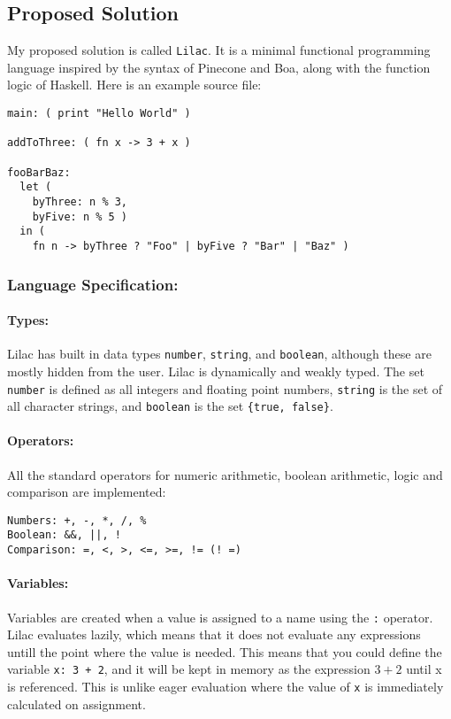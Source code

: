 \documentclass[a4paper, 12pt]{article}
\begin{document}
\subsection{Proposed Solution}\label{sec:proposed-solution}

My proposed solution is called \verb|Lilac|. It is a minimal functional programming language inspired by the syntax of Pinecone and Boa, along with the function logic of Haskell. Here is an example source file:\\
\begin{verbatim}
main: ( print "Hello World" )

addToThree: ( fn x -> 3 + x )

fooBarBaz:
  let (
    byThree: n % 3,
    byFive: n % 5 )
  in (
    fn n -> byThree ? "Foo" | byFive ? "Bar" | "Baz" )
\end{verbatim}
\subsubsection{Language Specification:}\label{sec:language-specification}
\paragraph{Types:}
Lilac has built in data types \verb|number|, \verb|string|, and \verb|boolean|, although these are mostly hidden from the user. Lilac is dynamically and weakly typed. The set \verb|number| is defined as all integers and floating point numbers, \verb|string| is the set of all character strings, and \verb|boolean| is the set \verb|{true, false}|.\\

\paragraph{Operators:}
All the standard operators for numeric arithmetic, boolean arithmetic, logic and comparison are implemented:\\
\begin{verbatim}
Numbers: +, -, *, /, %
Boolean: &&, ||, !
Comparison: =, <, >, <=, >=, != (! =)
\end{verbatim}

\paragraph{Variables:}
Variables are created when a value is assigned to a name using the \verb|:| operator. Lilac evaluates lazily, which means that it does not evaluate any expressions untill the point where the value is needed. This means that you could define the variable \verb|x: 3 + 2|, and it will be kept in memory as the expression $3+2$ until x is referenced. This is unlike eager evaluation where the value of \verb|x| is immediately calculated on assignment.
\end{document}
